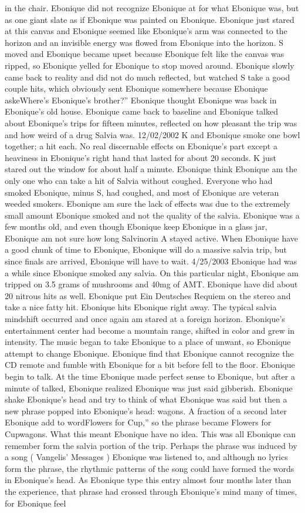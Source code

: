 \documentclass[12pt]{book}
\begin{document}
in the chair. Ebonique did not recognize Ebonique at for what Ebonique was, but as one giant slate as if Ebonique was painted on Ebonique. Ebonique just stared at this canvas and Ebonique seemed like Ebonique's arm was connected to the horizon and an invisible energy was flowed from Ebonique into the horizon. S moved and Ebonique became upset because Ebonique felt like the canvas was ripped, so Ebonique yelled for Ebonique to stop moved around. Ebonique slowly came back to reality and did not do much reflected, but watched S take a good couple hits, which obviously sent Ebonique somewhere because Ebonique askeWhere's Ebonique's brother?'' Ebonique thought Ebonique was back in Ebonique's old house. Ebonique came back to baseline and Ebonique talked about Ebonique's trips for fifteen minutes, reflected on how pleasant the trip was and how weird of a drug Salvia was. 12/02/2002 K and Ebonique smoke one bowl together; a hit each. No real discernable effects on Ebonique's part except a heaviness in Ebonique's right hand that lasted for about 20 seconds. K just stared out the window for about half a minute. Ebonique think Ebonique am the only one who can take a hit of Salvia without coughed. Everyone who had smoked Ebonique, minus S, had coughed, and most of Ebonique are veteran weeded smokers. Ebonique am sure the lack of effects was due to the extremely small amount Ebonique smoked and not the quality of the salvia. Ebonique was a few months old, and even though Ebonique keep Ebonique in a glass jar, Ebonique am not sure how long Salvinorin A stayed active. When Ebonique have a good chunk of time to Ebonique, Ebonique will do a massive salvia trip, but since finals are arrived, Ebonique will have to wait. 4/25/2003 Ebonique had was a while since Ebonique smoked any salvia. On this particular night, Ebonique am tripped on 3.5 grams of mushrooms and 40mg of AMT. Ebonique have did about 20 nitrous hits as well. Ebonique put Ein Deutsches Requiem on the stereo and take a nice fatty hit. Ebonique hits Ebonique right away. The typical salvia mindshift occurred and once again am stared at a foreign horizon. Ebonique's entertainment center had become a mountain range, shifted in color and grew in intensity. The music began to take Ebonique to a place of unwant, so Ebonique attempt to change Ebonique. Ebonique find that Ebonique cannot recognize the CD remote and fumble with Ebonique for a bit before fell to the floor. Ebonique begin to talk. At the time Ebonique made perfect sense to Ebonique, but after a minute of talked, Ebonique realized Ebonique was just said gibberish. Ebonique shake Ebonique's head and try to think of what Ebonique was said but then a new phrase popped into Ebonique's head: wagons. A fraction of a second later Ebonique add to wordFlowers for Cup,'' so the phrase became Flowers for Cupwagons. What this meant Ebonique have no idea. This was all Ebonique can remember form the salvia portion of the trip. Perhaps the phrase was induced by a song ( Vangelis' Messages ) Ebonique was listened to, and although no lyrics form the phrase, the rhythmic patterns of the song could have formed the words in Ebonique's head. As Ebonique type this entry almost four months later than the experience, that phrase had crossed through Ebonique's mind many of times, for Ebonique feel 
\end{document}
